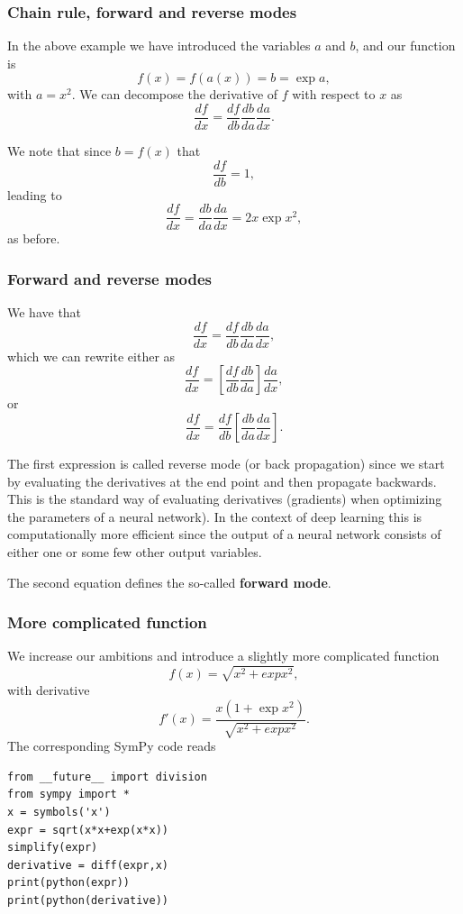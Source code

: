 \documentclass{beamer}
\begin{document}
\begin{frame}
\frametitle{Chain rule, forward and reverse modes}

In the above example we have introduced the variables $a$ and $b$, and our function is
\[
f(x) = f(a(x)) = b= \exp{a},
\]
with $a=x^2$. We can decompose the derivative of $f$ with respect to $x$ as
\[
\frac{df}{dx}=\frac{df}{db}\frac{db}{da}\frac{da}{dx}.
\]

We note that since $b=f(x)$ that
\[
\frac{df}{db}=1,
\]
leading to
\[
\frac{df}{dx}=\frac{db}{da}\frac{da}{dx}=2x\exp{x^2},
\]
as before.
\end{frame}

\begin{frame}
\frametitle{Forward and reverse modes}

We have that 
\[
\frac{df}{dx}=\frac{df}{db}\frac{db}{da}\frac{da}{dx},
\]
which we can rewrite either as
\[
\frac{df}{dx}=\left[\frac{df}{db}\frac{db}{da}\right]\frac{da}{dx},
\]
or
\[
\frac{df}{dx}=\frac{df}{db}\left[\frac{db}{da}\frac{da}{dx}\right].
\]

The first expression is called reverse mode (or back propagation)
since we start by evaluating the derivatives at the end point and then
propagate backwards. This is the standard way of evaluating
derivatives (gradients) when optimizing the parameters of a neural
network).  In the context of deep learning this is computationally
more efficient since the output of a neural network consists of either
one or some few other output variables.

The second equation defines the so-called  \textbf{forward mode}.
\end{frame}

\begin{frame}
\frametitle{More complicated function}

We increase our ambitions and introduce a slightly more complicated function
\[
f(x) =\sqrt{x^2+exp{x^2}},
\]
with derivative
\[
f'(x) =\frac{x(1+\exp{x^2})}{\sqrt{x^2+exp{x^2}}}.
\]
The corresponding SymPy code reads









\begin{verbatim}
from __future__ import division
from sympy import *
x = symbols('x')
expr = sqrt(x*x+exp(x*x))
simplify(expr)
derivative = diff(expr,x)
print(python(expr))
print(python(derivative))

\end{verbatim}
\end{frame}
\end{document}
